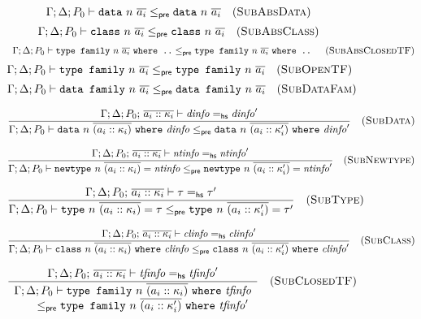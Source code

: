 \begin{figure}

\[
\Gamma; \Delta; P_0 \vdash \texttt{data}~n~\overline{a_i} \le_\textsf{pre} \texttt{data}~n~\overline{a_i}
\quad(\textsc{SubAbsData})
\]
\[
\Gamma; \Delta; P_0 \vdash \texttt{class}~n~\overline{a_i} \le_\textsf{pre} \texttt{class}~n~\overline{a_i}
\quad(\textsc{SubAbsClass})
\]
\[
\begin{array}{c}
\Gamma; \Delta; P_0 \vdash \texttt{type family}~n~\overline{a_i} ~\texttt{where ..}
\le_\textsf{pre} \texttt{type family}~n~\overline{a_i} ~\texttt{where ..}
\end{array}
\quad(\textsc{SubAbsClosedTF})
\]
\[
\Gamma; \Delta; P_0 \vdash \texttt{type family}~n~\overline{a_i} \le_\textsf{pre} \texttt{type family}~n~\overline{a_i}
\quad(\textsc{SubOpenTF})
\]
\[
\Gamma; \Delta; P_0 \vdash \texttt{data family}~n~\overline{a_i} \le_\textsf{pre} \texttt{data family}~n~\overline{a_i}
\quad(\textsc{SubDataFam})
\]


\[
\frac{
\Gamma; \Delta; P_0;\, \overline{a_i :: \kappa_i} \vdash \mathit{dinfo} =_\textsf{hs} \mathit{dinfo}'
}{
\Gamma; \Delta; P_0 \vdash \texttt{data}~n~\overline{(a_i :: \kappa_i)} ~\texttt{where}~ \mathit{dinfo} \le_\textsf{pre} \texttt{data}~n~\overline{(a_i :: \kappa'_i)} ~\texttt{where}~ \mathit{dinfo}'
}
\quad(\textsc{SubData})
\]

\[
\frac{
\Gamma; \Delta; P_0;\, \overline{a_i :: \kappa_i} \vdash \mathit{ntinfo} =_\textsf{hs} \mathit{ntinfo}'
}{
\Gamma; \Delta; P_0 \vdash \texttt{newtype}~n~\overline{(a_i :: \kappa_i)} = \mathit{ntinfo} \le_\textsf{pre} \texttt{newtype}~n~\overline{(a_i :: \kappa'_i)} = \mathit{ntinfo}'
}
\quad(\textsc{SubNewtype})
\]

\[
\frac{
\Gamma; \Delta; P_0;\, \overline{a_i :: \kappa_i} \vdash \tau =_\textsf{hs} \tau'
}{
\Gamma; \Delta; P_0 \vdash \texttt{type}~n~\overline{(a_i :: \kappa_i)} = \tau \le_\textsf{pre} \texttt{type}~n~\overline{(a_i :: \kappa'_i)} = \tau'
}
\quad(\textsc{SubType})
\]

\[
\frac{
\Gamma; \Delta; P_0;\, \overline{a_i :: \kappa_i} \vdash \mathit{clinfo} =_\textsf{hs} \mathit{clinfo}'
}{
\Gamma; \Delta; P_0 \vdash \texttt{class}~n~\overline{(a_i :: \kappa_i)} ~\texttt{where}~ \mathit{clinfo} \le_\textsf{pre} \texttt{class}~n~\overline{(a_i :: \kappa'_i)} ~\texttt{where}~ \mathit{clinfo}'
}
\quad(\textsc{SubClass})
\]

\[
\frac{
\Gamma; \Delta; P_0;\, \overline{a_i :: \kappa_i} \vdash \mathit{tfinfo} =_\textsf{hs} \mathit{tfinfo}'
}{
\begin{array}{l}
\Gamma; \Delta; P_0 \vdash \texttt{type family}~n~\overline{(a_i :: \kappa_i)} ~\texttt{where}~ \mathit{tfinfo}
\\ \qquad \le_\textsf{pre} \texttt{type family}~n~\overline{(a_i :: \kappa'_i)} ~\texttt{where}~ \mathit{tfinfo}'
\end{array}
}
\quad(\textsc{SubClosedTF})
\]


\end{figure}
